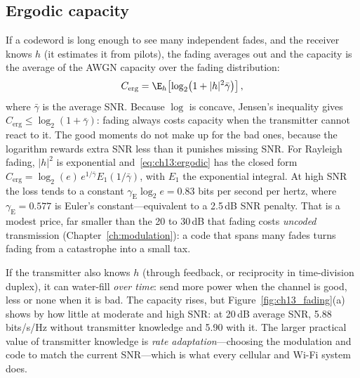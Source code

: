 \subsection{Ergodic capacity}

If a codeword is long enough to see many independent fades, and the receiver knows $h$ (it
estimates it from pilots), the fading averages out and the capacity is the average of the AWGN
capacity over the fading distribution:
\begin{equation}
C_{\text{erg}}=\E_h\!\left[\log_2\!\big(1+|h|^2\bar\gamma\big)\right],
\label{eq:ch13:ergodic}
\end{equation}
where $\bar\gamma$ is the average SNR. Because $\log$ is concave, Jensen's inequality gives
$C_{\text{erg}}\le\log_2(1+\bar\gamma)$: fading always costs capacity when the transmitter cannot
react to it. The good moments do not make up for the bad ones, because the logarithm rewards
extra SNR less than it punishes missing SNR. For Rayleigh fading, $|h|^2$ is exponential
and~\eqref{eq:ch13:ergodic} has the closed form $C_{\text{erg}}=\log_2(e)\,e^{1/\bar\gamma}E_1(1/\bar\gamma)$,
with $E_1$ the exponential integral. At high SNR the loss tends to a constant
$\gamma_{\mathrm{E}}\log_2e=0.83$ bits per second per hertz, where $\gamma_{\mathrm{E}}=0.577$ is
Euler's constant---equivalent to a 2.5\,dB SNR penalty. That is a modest price, far smaller than the
20 to 30\,dB that fading costs \emph{uncoded} transmission (Chapter~\ref{ch:modulation}): a code
that spans many fades turns fading from a catastrophe into a small tax.

If the transmitter also knows $h$ (through feedback, or reciprocity in time-division duplex), it
can water-fill \emph{over time}: send more power when the channel is good, less or none when it is
bad. The capacity rises, but Figure~\ref{fig:ch13_fading}(a) shows by how little at moderate and high
SNR: at 20\,dB average SNR, 5.88 bits/s/Hz without transmitter knowledge and 5.90 with it. The
larger practical value of transmitter knowledge is \emph{rate adaptation}---choosing the
modulation and code to match the current SNR---which is what every cellular and Wi-Fi system does.


